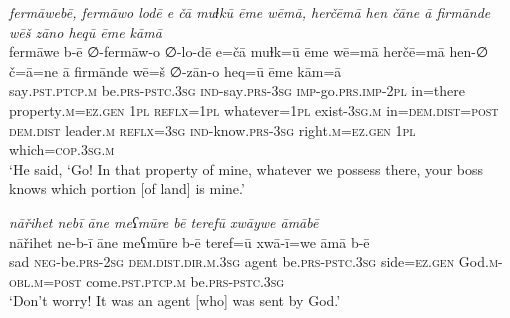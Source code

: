 \ea \label{PM.20}
\textit{fermāwebē, fermāwo lodē e čā muɫkū ēme wēmā, herčēmā hen čāne ā firmānde wēš zāno heqū ēme kāmā} \\ 
\gll fermāwe b-ē ∅-fermāw-o ∅-lo-dē e=čā muɫk=ū ēme wē=mā herčē=mā hen-∅ č=ā=ne ā firmānde wē=š ∅-zān-o heq=ū ēme kām=ā \\ 
 say\textsc{.pst}\textsc{.ptcp}\textsc{.m} be\textsc{.prs}\textsc{-pstc}\textsc{.3sg} \textsc{ind-}say\textsc{.prs}\textsc{-3sg} \textsc{imp-}go\textsc{.prs}.\textsc{imp-}\textsc{2pl} in=there property\textsc{.m}\textsc{\textsc{=ez.gen}} \textsc{1pl} \textsc{reflx}\textsc{=1pl} whatever\textsc{=1pl} exist\textsc{-3sg}\textsc{.m} in=\textsc{dem.dist}\textsc{=\textsc{post}} \textsc{dem.dist} leader\textsc{.m} \textsc{reflx}\textsc{=3sg} \textsc{ind-}know\textsc{.prs}\textsc{-3sg} right\textsc{.m}\textsc{\textsc{=ez.gen}} \textsc{1pl} which\textsc{=cop}\textsc{.3sg}\textsc{.m} \\ 
\glt `He said, ‘Go! In that property of mine, whatever we possess there, your boss knows which portion [of land] is mine.'
\z 
 
\ea \label{PM.34}
\textit{nāřihet nebī āne meʕmūre bē terefū xwāywe āmābē} \\ 
\gll nāřihet ne-b-ī āne meʕmūre b-ē teref=ū xwā-ī=we āmā b-ē \\ 
 sad \textsc{neg-}be\textsc{.prs}-\textsc{2sg} \textsc{dem.dist}\textsc{.dir}\textsc{.m}\textsc{.3sg} agent be\textsc{.prs}\textsc{-pstc}\textsc{.3sg} side\textsc{\textsc{=ez.gen}} God\textsc{.m}\textsc{-obl}\textsc{.m}\textsc{=\textsc{post}} come\textsc{.pst}\textsc{.ptcp}\textsc{.m} be\textsc{.prs}\textsc{-pstc}\textsc{.3sg} \\ 
\glt `Don’t worry! It was an agent [who] was sent  by God.'
\z 
 
